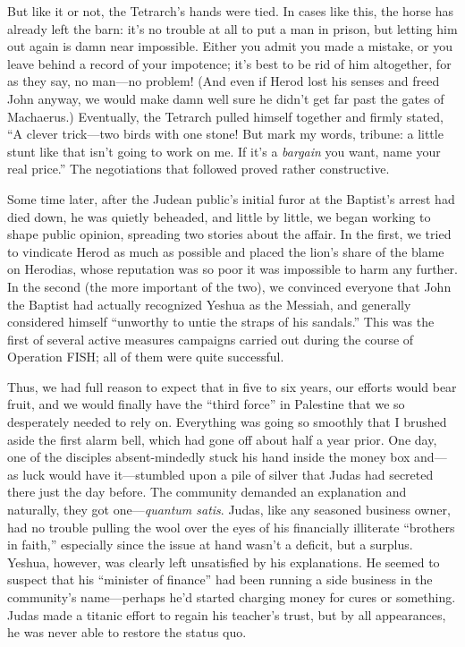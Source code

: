 But like it or not, the Tetrarch's hands were tied. In cases like this, the horse has already left the barn: it's no trouble at all to put a man in prison, but letting him out again is damn near impossible. Either you admit you made a mistake, or you leave behind a record of your impotence; it's best to be rid of him altogether, for as they say, no man---no problem! (And even if Herod lost his senses and freed John anyway, we would make damn well sure he didn't get far past the gates of Machaerus.) Eventually, the Tetrarch pulled himself together and firmly stated, ``A clever trick---two birds with one stone! But mark my words, tribune: a little stunt like that isn't going to work on me. If it's a \emph{bargain} you want, name your real price.'' The negotiations that followed proved rather constructive.

Some time later, after the Judean public's initial furor at the Baptist's arrest had died down, he was quietly beheaded, and little by little, we began working to shape public opinion, spreading two stories about the affair. In the first, we tried to vindicate Herod as much as possible and placed the lion's share of the blame on Herodias, whose reputation was so poor it was impossible to harm any further. In the second (the more important of the two), we convinced everyone that John the Baptist had actually recognized Yeshua as the Messiah, and generally considered himself ``unworthy to untie the straps of his sandals.'' This was the first of several active measures campaigns carried out during the course of Operation FISH; all of them were quite successful.

Thus, we had full reason to expect that in five to six years, our efforts would bear fruit, and we would finally have the ``third force'' in Palestine that we so desperately needed to rely on. Everything was going so smoothly that I brushed aside the first alarm bell, which had gone off about half a year prior. One day, one of the disciples absent-mindedly stuck his hand inside the money box and---as luck would have it---stumbled upon a pile of silver that Judas had secreted there just the day before. The community demanded an explanation and naturally, they got one---\emph{quantum satis}. Judas, like any seasoned business owner, had no trouble pulling the wool over the eyes of his financially illiterate ``brothers in faith,'' especially since the issue at hand wasn't a deficit, but a surplus. Yeshua, however, was clearly left unsatisfied by his explanations. He seemed to suspect that his ``minister of finance'' had been running a side business in the community's name---perhaps he'd started charging money for cures or something. Judas made a titanic effort to regain his teacher's trust, but by all appearances, he was never able to restore the status quo.

